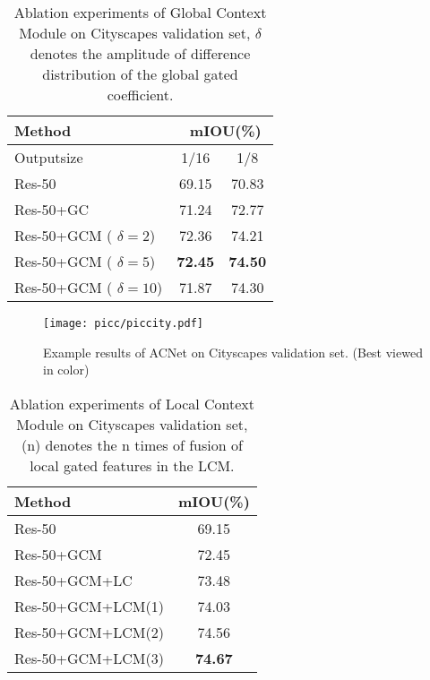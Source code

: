 \documentclass[10pt,twocolumn,letterpaper]{article}
\begin{document}
\begin{table}[t]
\begin{center}
\begin{tabular}{l|c|c}
\toprule
Method & \multicolumn{2}{c}{\ mIOU(\%)}\\
\hline
Outputsize &1/16& 1/8\\
\hline
\hline
 \noalign{\smallskip}
Res-50 & 69.15& 70.83\\
Res-50+GC & 71.24& 72.77\\
\hline
 \noalign{\smallskip}
Res-50+GCM ( $\delta =2$)& 72.36 & 74.21\\
Res-50+GCM ( $\delta =5$)& \textbf{72.45}&\textbf{74.50}\\
Res-50+GCM ( $\delta =10$)& 71.87& 74.30\\
\hline
\bottomrule
\end{tabular}
\end{center}
\caption{Ablation experiments of Global Context Module on Cityscapes validation set, $\delta$ denotes the amplitude of difference distribution of the global gated coefficient.}
\label{globalT}
\end{table}


\begin{figure*}[!t]
        \centering
        \texttt{[image: picc/piccity.pdf]}
  \caption{Example results of ACNet on Cityscapes validation set. (Best viewed in color)}
         \label{SPAM}
        \vspace{-1em}    
  
\end{figure*}


\begin{table}[t]
\begin{center}
\begin{tabular}{l|c}
\toprule
Method & mIOU(\%)\\
\hline
\hline
 \noalign{\smallskip}
Res-50 & 69.15\\
Res-50+GCM & 72.45\\
Res-50+GCM+LC & 73.48\\
\hline
 \noalign{\smallskip}
Res-50+GCM+LCM(1) & 74.03\\
Res-50+GCM+LCM(2)& 74.56\\ 
Res-50+GCM+LCM(3)& \textbf{74.67}\\
\hline
\bottomrule
\end{tabular}
\end{center}
\caption{Ablation experiments of Local Context Module on Cityscapes validation set, (n)  denotes the n times of fusion of local gated features in the LCM.  }
\label{localT}
     \vspace{-1em}    
\end{table}
\end{document}
